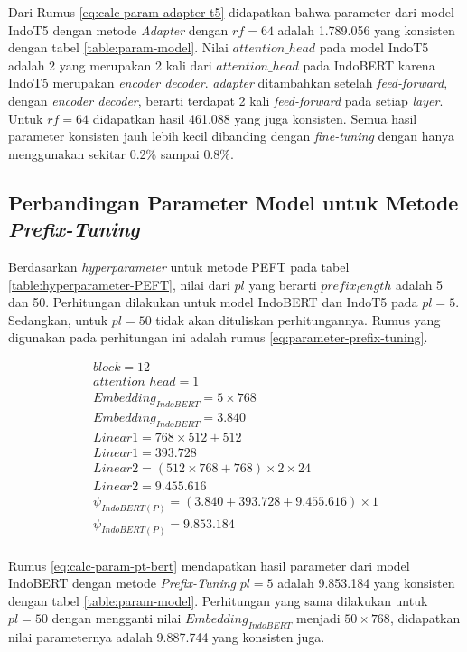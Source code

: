 Dari Rumus \ref{eq:calc-param-adapter-t5} didapatkan bahwa parameter dari model IndoT5 dengan metode \textit{Adapter} dengan $rf=64$ adalah 1.789.056 yang konsisten dengan tabel \ref{table:param-model}. Nilai $attention\_head$ pada model IndoT5 adalah 2 yang merupakan 2 kali dari $attention\_head$ pada IndoBERT karena IndoT5 merupakan \textit{encoder decoder}. \textit{adapter} ditambahkan setelah \textit{feed-forward}, dengan \textit{encoder decoder}, berarti terdapat 2 kali \textit{feed-forward} pada setiap \textit{layer}. Untuk $rf=64$ didapatkan hasil 461.088 yang juga konsisten. Semua hasil parameter konsisten jauh lebih kecil dibanding dengan \textit{fine-tuning} dengan hanya menggunakan sekitar 0.2\% sampai 0.8\%.

\subsection{Perbandingan Parameter Model untuk Metode \textit{Prefix-Tuning}}

Berdasarkan \textit{hyperparameter} untuk metode PEFT pada tabel \ref{table:hyperparameter-PEFT}, nilai dari $pl$ yang berarti $prefix_length$ adalah 5 dan 50. Perhitungan dilakukan untuk model IndoBERT dan IndoT5 pada $pl=5$. Sedangkan, untuk $pl=50$ tidak akan dituliskan perhitungannya. Rumus yang digunakan pada perhitungan ini adalah rumus \ref{eq:parameter-prefix-tuning}.

\begin{equation}
    \begin{aligned}
        block = 12 \\
        attention\_head = 1 \\
        Embedding_{IndoBERT} = 5 \times 768 \\
        Embedding_{IndoBERT} = 3.840 \\
        Linear1 = 768 \times 512 + 512 \\
        Linear1 = 393.728 \\
        Linear2 = (512 \times 768 + 768) \times 2 \times 24 \\
        Linear2 = 9.455.616 \\
        \psi_{IndoBERT(P)} = (3.840 + 393.728 + 9.455.616) \times 1 \\
        \psi_{IndoBERT(P)} = 9.853.184 \\
    \end{aligned}
    \label{eq:calc-param-pt-bert}
\end{equation}

Rumus \ref{eq:calc-param-pt-bert} mendapatkan hasil parameter dari model IndoBERT dengan metode \textit{Prefix-Tuning} $pl=5$ adalah 9.853.184 yang konsisten dengan tabel \ref{table:param-model}. Perhitungan yang sama dilakukan untuk $pl=50$ dengan mengganti nilai $Embedding_{IndoBERT}$ menjadi $50 \times 768$, didapatkan nilai parameternya adalah 9.887.744 yang konsisten juga.

